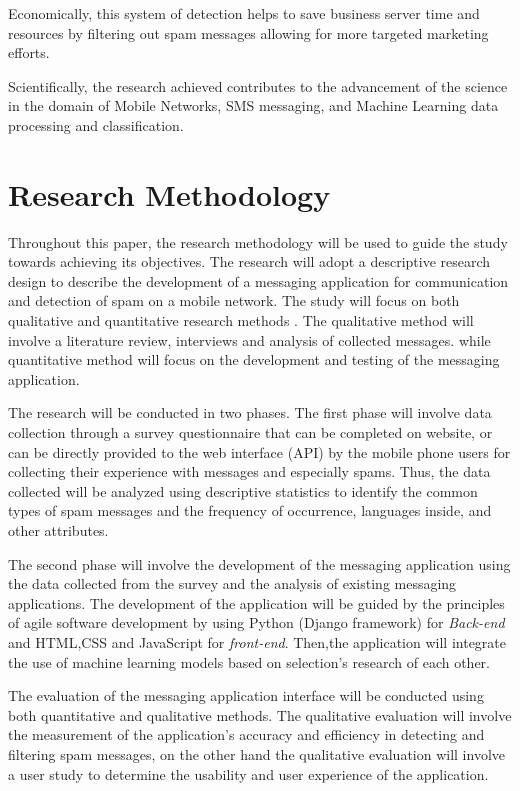 \documentclass[12pt,a4paper]{report}
\begin{document}
	Economically, this system of detection helps to save business server time and resources by filtering out spam messages allowing for more targeted marketing efforts. 
	
	Scientifically, the research achieved contributes to the advancement of the science in the domain of Mobile Networks, SMS messaging, and Machine Learning data processing and classification.
	
	\section{Research Methodology}
	Throughout this paper, the research methodology will be used to guide the study towards achieving its objectives. The research will adopt a descriptive research design to describe the development of a messaging application for communication and detection of spam on a mobile network. The study will focus on both qualitative and quantitative research methods \cite{creswell2014research}. The qualitative method will involve a literature review, interviews and analysis of collected messages. while quantitative method will focus on the development and testing of the messaging application.
	
	The research will be conducted in two phases. The first phase will involve data collection through a survey questionnaire that can be completed on website, or can be directly provided to the web interface (API) by the mobile phone users for collecting their experience with messages and especially spams. Thus, the data collected will be analyzed using descriptive statistics \cite{bluman2017elementary} to identify the common types of spam messages and the frequency of occurrence, languages inside, and other attributes.  
	
	The second phase will involve the development of the messaging application using the data collected from the survey and the analysis of existing messaging applications. The development of the application will be guided by the principles of agile software development by using Python (Django framework) for \textit{Back-end} and HTML,CSS and JavaScript for \textit{front-end}. Then,the application will  integrate the use of machine learning models based on selection's research of each other.
	
	The evaluation of the messaging application interface will be conducted using both quantitative and qualitative methods. The qualitative evaluation will involve the measurement of the application's accuracy and efficiency in detecting and filtering spam messages, on the other hand the qualitative evaluation will involve a user study to determine the usability and user experience of the application.
	
\end{document}

